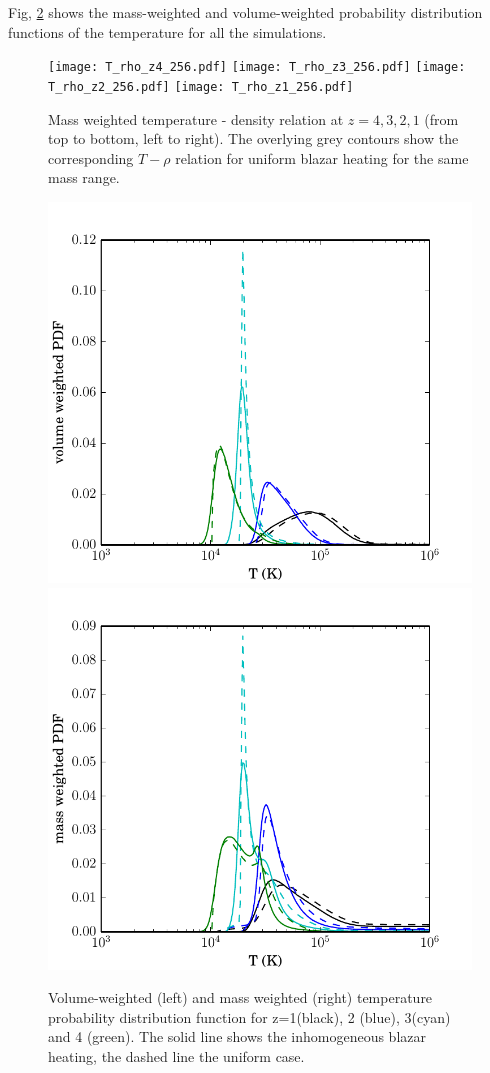 \documentclass[twocolumns]{emulateapj}
\begin{document}
{Fig, \ref{fig:PDF} shows the mass-weighted and volume-weighted probability distribution functions of the temperature for all the simulations. 


\begin{figure}
  \centering
  \texttt{[image: T\_rho\_z4\_256.pdf]}
  \texttt{[image: T\_rho\_z3\_256.pdf]}
  \texttt{[image: T\_rho\_z2\_256.pdf]}
  \texttt{[image: T\_rho\_z1\_256.pdf]}
  \caption{Mass weighted temperature - density relation  at  $z=4,3,2,1$ (from top to bottom, left to right). The overlying grey contours show the corresponding $T-\rho$ relation for uniform blazar heating \citep{2012MNRAS.423..149P} for the same mass range. }
  \label{fig:T_rho}
\end{figure}


\begin{figure}[h]
  \centering
  \includegraphics[width = .42\textwidth ]{full_PDF_256.pdf}
  \includegraphics[width = .42\textwidth ]{mass_weighted_PDF_256.pdf}
  \caption{Volume-weighted (left) and mass weighted (right)  temperature probability distribution function for z=1(black), 2 (blue), 3(cyan) and 4 (green). The solid line shows the inhomogeneous blazar heating, the dashed line the uniform case. }
  \label{fig:PDF}
\end{figure}


}
\end{document}
